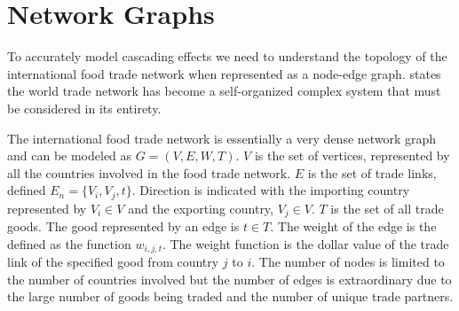 \section{Network Graphs}
To accurately model cascading effects we need to understand the topology of the international food trade network when represented as a node-edge graph. \cite{serrano2003topology} states the world trade network has become a self-organized complex system that must be considered in its entirety.\par
The international food trade network is essentially a very dense network graph and can be modeled as $G=(V,E,W,T)$. $V$ is the set of vertices, represented by all the countries involved in the food trade network. $E$ is the set of trade links, defined $E_n=\lbrace V_i, V_j, t \rbrace$. Direction is indicated with the importing country represented by $V_i \in V$ and the exporting country, $V_j \in V$. $T$ is the set of all trade goods. The good represented by an edge is $t \in T$. The weight of the edge is the defined as the function $w_{i,j,t}$. The weight function is the dollar value of the trade link of the specified good from country $j$ to $i$. The number of nodes is limited to the number of countries involved but the number of edges is extraordinary due to the large number of goods being traded and the number of unique trade partners.\par
